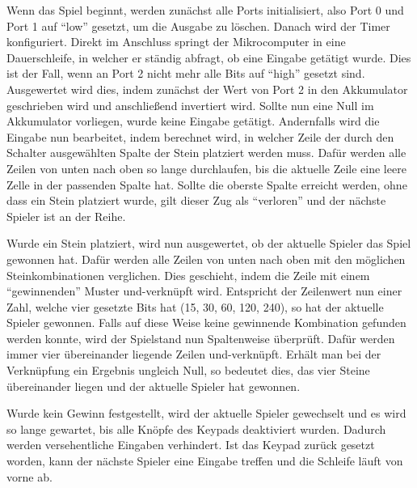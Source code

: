 Wenn das Spiel beginnt, werden zunächst alle Ports initialisiert, also Port 0 und Port 1 auf \enquote{low} gesetzt, um die Ausgabe zu löschen.
Danach wird der Timer konfiguriert.
Direkt im Anschluss springt der Mikrocomputer in eine Dauerschleife, in welcher er ständig abfragt, ob eine Eingabe getätigt wurde.
Dies ist der Fall, wenn an Port 2 nicht mehr alle Bits auf \enquote{high} gesetzt sind. 
Ausgewertet wird dies, indem zunächst der Wert von Port 2 in den Akkumulator geschrieben wird und anschließend invertiert wird. Sollte nun eine Null im Akkumulator vorliegen, wurde keine Eingabe getätigt.
Andernfalls wird die Eingabe nun bearbeitet, indem berechnet wird, in welcher Zeile der durch den Schalter ausgewählten Spalte der Stein platziert werden muss. Dafür werden alle Zeilen von unten nach oben so lange durchlaufen, bis die aktuelle Zeile eine leere Zelle in der passenden Spalte hat. Sollte die oberste Spalte erreicht werden, ohne dass ein Stein platziert wurde, gilt dieser Zug als \enquote{verloren} und der nächste Spieler ist an der Reihe.

Wurde ein Stein platziert, wird nun ausgewertet, ob der aktuelle Spieler das Spiel gewonnen hat. Dafür werden alle Zeilen von unten nach oben mit den möglichen Steinkombinationen verglichen. Dies geschieht, indem die Zeile mit einem \enquote{gewinnenden} Muster und-verknüpft wird. Entspricht der Zeilenwert nun einer Zahl, welche vier gesetzte Bits hat (15, 30, 60, 120, 240), so hat der aktuelle Spieler gewonnen.
Falls auf diese Weise keine gewinnende Kombination gefunden werden konnte, wird der Spielstand nun Spaltenweise überprüft. Dafür werden immer vier übereinander liegende Zeilen und-verknüpft. Erhält man bei der Verknüpfung ein Ergebnis ungleich Null, so bedeutet dies, das vier Steine übereinander liegen und der aktuelle Spieler hat gewonnen.

Wurde kein Gewinn festgestellt, wird der aktuelle Spieler gewechselt und es wird so lange gewartet, bis alle Knöpfe des Keypads deaktiviert wurden. Dadurch werden versehentliche Eingaben verhindert. 
Ist das Keypad zurück gesetzt worden, kann der nächste Spieler eine Eingabe treffen und die Schleife läuft von vorne ab.

